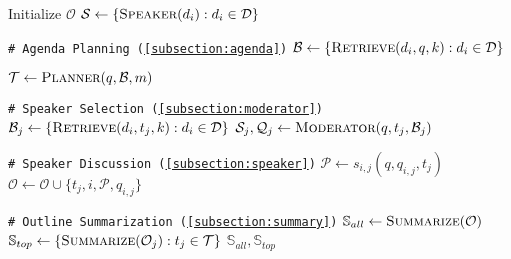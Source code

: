 
\begin{algorithm*}
\caption{\model}\label{algo:mods}
\footnotesize
\begin{algorithmic}[1]

\State Initialize $\mathcal{O}$
\State $\mathcal{S} \gets \{\textsc{Speaker}(d_i) : d_i \in \mathcal{D} \}$

\State \texttt{\# Agenda Planning (\cref{subsection:agenda})}
\State $\mathcal{B} \gets \{\textsc{Retrieve}(d_i, q, k) : d_i \in \mathcal{D} \}$

\State $\mathcal{T} \gets \textsc{Planner}(q, \mathcal{B}, m)$

    \State \texttt{\# Speaker Selection (\cref{subsection:moderator})}
    \State $\mathcal{B}_j \gets \{\textsc{Retrieve}(d_i, t_j, k) : d_i \in \mathcal{D} \}$
    \State $\mathcal{S}_j, \mathcal{Q}_j \gets \textsc{Moderator}(q, t_j, \mathcal{B}_j)$

        \State \texttt{\# Speaker Discussion (\cref{subsection:speaker})}
        \State $\mathcal{P} \gets s_{i,j}(q, q_{i,j}, t_j)$
        \State $\mathcal{O} \gets \mathcal{O} \cup \{t_j, i, \mathcal{P}, q_{i, j}\}$ 
    \EndFor
\EndFor

\State \texttt{\# Outline Summarization (\cref{subsection:summary})}
\State $\mathbb{S}_{all} \gets \textsc{Summarize}(\mathcal{O})$
\State $\mathbb{S}_{top} \gets \{\textsc{Summarize}(\mathcal{O}_j) : t_j \in \mathcal{T}\}$
\State \Return $\mathbb{S}_{all}, \mathbb{S}_{top}$

\EndProcedure
\end{algorithmic}
\end{algorithm*}